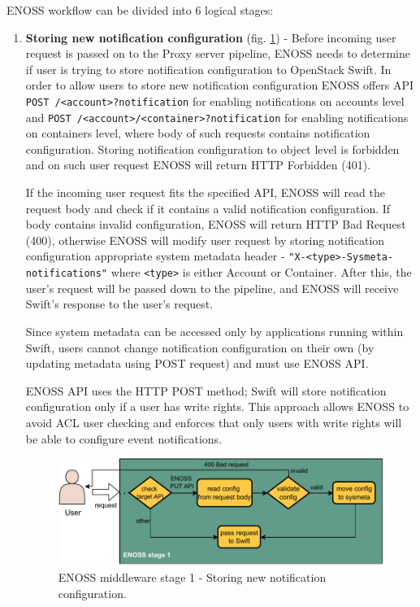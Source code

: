     ENOSS workflow can be divided into 6 logical stages:
    \begin{enumerate}
        \item \textbf{Storing new notification configuration} (fig. \ref{fig:enoss-stage1}) - Before incoming user request is passed on to the Proxy server pipeline, ENOSS needs to determine if user is trying to store notification configuration to OpenStack Swift. In order to allow users to store new notification configuration ENOSS offers API \texttt{POST /<account>?notification} for enabling notifications on accounts level and \texttt{POST /<account>/<container>?notification} for enabling notifications on containers level, where body of such requests contains notification configuration. Storing notification configuration to object level is forbidden and on such user request ENOSS will return HTTP Forbidden (401).

        If the incoming user request fits the specified API, ENOSS will read the request body and check if it contains a valid notification configuration. If body contains invalid configuration, ENOSS will return HTTP Bad Request (400), otherwise ENOSS will modify user request by storing notification configuration appropriate system metadata header - \texttt{"X-<type>-Sysmeta-notifications"} where \texttt{<type>} is either Account or Container. After this, the user's request will be passed down to the pipeline, and ENOSS will receive Swift's response to the user's request.

        Since system metadata can be accessed only by applications running within Swift, users cannot change notification configuration on their own (by updating metadata using POST request) and must use ENOSS API.

        ENOSS API uses the HTTP POST method; Swift will store notification configuration only if a user has write rights. This approach allows ENOSS to avoid ACL user checking and enforces that only users with write rights will be able to configure event notifications.

        \begin{figure}[H]
            \centering
            \includegraphics[width=1\textwidth]{obrazky-figures/enoss-stage1.pdf}
            \caption{ENOSS middleware stage 1 - Storing new notification configuration.}
            \label{fig:enoss-stage1}
        \end{figure}


\end{enumerate}
